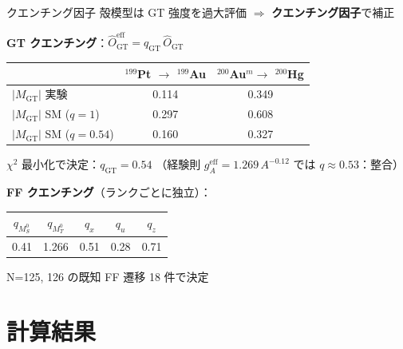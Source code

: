 \documentclass[aspectratio=169,12pt]{beamer}
\begin{document}
\begin{frame}{クエンチング因子}
  殻模型は GT 強度を過大評価 $\Rightarrow$ \textbf{クエンチング因子}で補正

  \textbf{GT クエンチング}：$\hat{O}_\text{GT}^\text{eff} = q_\text{GT}\,\hat{O}_\text{GT}$

  \begin{center}
  \begin{tabular}{lcc}
    \toprule
    & $^{199}$Pt $\to$ $^{199}$Au & $^{200}$Au$^m \to$ $^{200}$Hg \\
    \midrule
    $|M_\text{GT}|$ 実験 & 0.114 & 0.349 \\
    $|M_\text{GT}|$ SM ($q=1$) & 0.297 & 0.608 \\
    $|M_\text{GT}|$ SM ($q=0.54$) & 0.160 & 0.327 \\
    \bottomrule
  \end{tabular}
  \end{center}

  $\chi^2$ 最小化で決定：\alert{$q_\text{GT} = 0.54$}
  \quad（経験則 $g_A^\text{eff} = 1.269\,A^{-0.12}$ では $q \approx 0.53$：整合）

  \vspace{0.5em}
  \textbf{FF クエンチング}（ランクごとに独立）：

  \begin{center}
  \begin{tabular}{ccccc}
    \toprule
    $q_{M_S^0}$ & $q_{M_T^0}$ & $q_x$ & $q_u$ & $q_z$ \\
    \midrule
    0.41 & 1.266 & 0.51 & 0.28 & 0.71 \\
    \bottomrule
  \end{tabular}
  \end{center}
  N=125, 126 の既知 FF 遷移 18 件で決定
\end{frame}

\section{計算結果}
\end{document}
